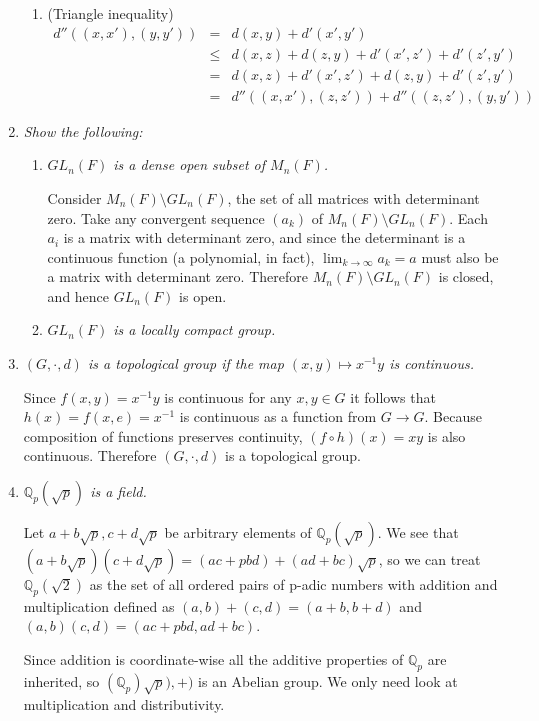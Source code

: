 \documentclass[11pt]{article}
\begin{document}
\begin{enumerate}
\begin{enumerate}
\item{(Triangle inequality)} 
\begin{eqnarray*}
d''((x,x'), (y,y')) &=& d(x,y) + d'(x',y') \\
&\leq&  d(x,z) + d(z,y) + d'(x',z') + d'(z',y') \\
&=& d(x,z) + d'(x',z') + d(z,y) + d'(z',y') \\
&=& d''((x,x'), (z,z')) + d''((z,z'), (y,y'))
\end{eqnarray*}
\end{enumerate}

\item \emph{Show the following:}
\begin{enumerate}
\item \emph{$GL_n(F)$ is a dense open subset of $M_n(F)$.}

Consider $M_n(F) \setminus GL_n(F)$, the set of all matrices with determinant zero.  Take any convergent sequence $(a_k)$ of $M_n(F) \setminus GL_n(F)$.  Each $a_i$ is a matrix with determinant zero, and since the determinant is a continuous function (a polynomial, in fact), $\lim_{k \rightarrow \infty} a_k = a$ must also be a matrix with determinant zero.  Therefore $M_n(F) \setminus GL_n(F)$ is closed, and hence $GL_n(F)$ is open.


\item \emph{$GL_n(F)$ is a locally compact group.}
\end{enumerate}

\item \emph{$(G, \cdot, d)$ is a topological group if the map $(x,y) \mapsto x^{-1}y$ is continuous.}

Since $f(x,y) = x^{-1}y$ is continuous for any $x,y \in G$ it follows that $h(x) = f(x,e) = x^{-1}$ is continuous as a function from $G \rightarrow G$.  Because composition of functions preserves continuity, $(f \circ h)(x) = xy$ is also continuous.  Therefore $(G, \cdot, d)$ is a topological group.

\item \emph{$\mathbb{Q}_p(\sqrt{p})$ is a field.}

Let $a+b\sqrt{p},c+d\sqrt{p}$ be arbitrary elements of $\mathbb{Q}_p(\sqrt{p})$.
We see that $(a+b\sqrt{p})(c+d\sqrt{p}) = (ac+pbd)+(ad+bc)\sqrt{p}$, so we can treat $\mathbb{Q}_p(\sqrt{2})$ as the set of all ordered pairs of p-adic numbers with addition and multiplication defined as $(a,b)+(c,d) = (a+b,b+d)$ and $(a,b)(c,d) = (ac+pbd,ad+bc)$.

Since addition is coordinate-wise all the additive properties of $\mathbb{Q}_p$ are inherited, so $(\mathbb{Q}_p)\sqrt{p}),+)$ is an Abelian group.  We only need look at multiplication and distributivity.


\end{enumerate}
\end{document}
